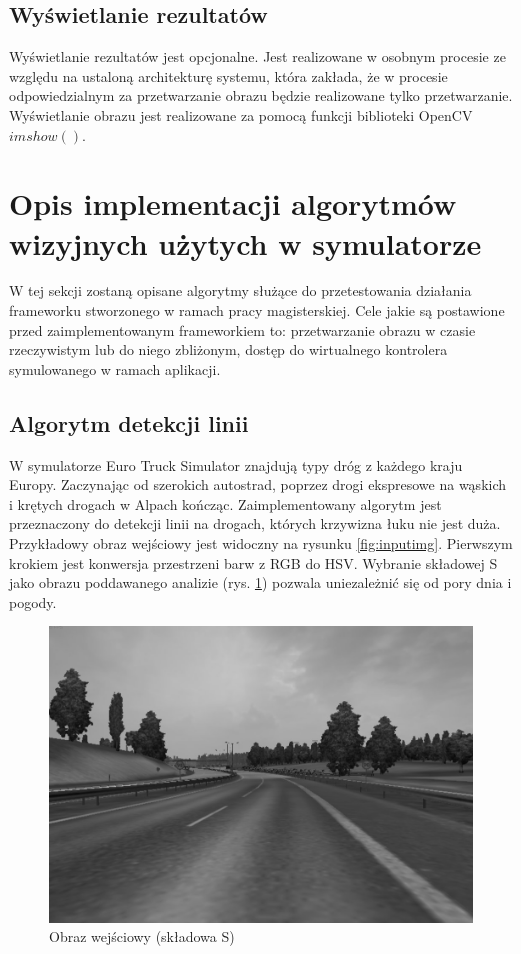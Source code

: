 \subsection{Wyświetlanie rezultatów}
Wyświetlanie rezultatów jest opcjonalne. Jest realizowane w osobnym procesie ze względu na ustaloną architekturę systemu, która zakłada, że w procesie odpowiedzialnym za przetwarzanie obrazu będzie realizowane tylko przetwarzanie. Wyświetlanie obrazu jest realizowane za pomocą funkcji biblioteki OpenCV $imshow()$.


\section{Opis implementacji algorytmów wizyjnych użytych w symulatorze}
W tej sekcji zostaną opisane algorytmy służące do przetestowania działania frameworku stworzonego w ramach pracy magisterskiej. Cele jakie są postawione przed zaimplementowanym frameworkiem to: przetwarzanie obrazu w czasie rzeczywistym lub do niego zbliżonym, dostęp do wirtualnego kontrolera symulowanego w ramach aplikacji.

\subsection{Algorytm detekcji linii}

W symulatorze Euro Truck Simulator znajdują typy dróg z każdego kraju Europy. Zaczynając od szerokich autostrad, poprzez drogi ekspresowe na wąskich i krętych drogach w Alpach kończąc. Zaimplementowany algorytm jest przeznaczony do detekcji linii na drogach, których krzywizna łuku nie jest duża. Przykładowy obraz wejściowy jest widoczny na rysunku \ref{fig:inputimg}. Pierwszym krokiem jest konwersja przestrzeni barw z RGB do HSV. Wybranie składowej S jako obrazu poddawanego analizie (rys. \ref{fig:alg1_S}) pozwala uniezależnić się od pory dnia i pogody.

\begin{figure}
  \centering
  \includegraphics[width=13cm]{img/alg1_gray.jpg}
  \caption{Obraz wejściowy (składowa S)}
  \label{fig:alg1_S}
\end{figure}

